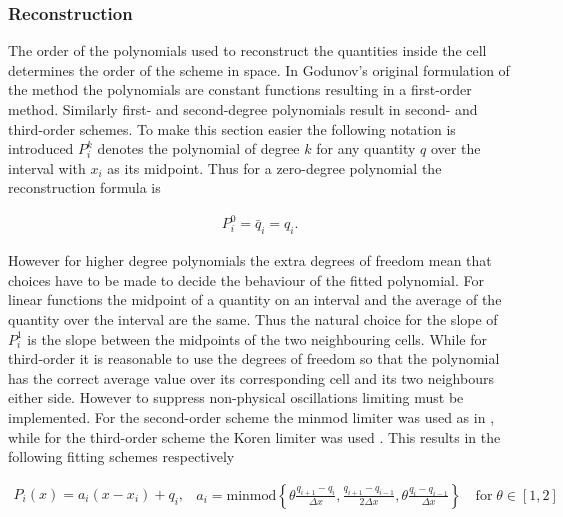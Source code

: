 \documentclass[SingleSpace,12pt]{Serre_ASCE}
\begin{document}
\subsubsection{Reconstruction} %
The order of the polynomials used to reconstruct the quantities inside the cell determines the order of the scheme in space. In Godunov's original formulation of the method \cite{Godunov-1959-271} the polynomials are constant functions resulting in a first-order method. Similarly first- and second-degree polynomials result in second- and third-order schemes. To make this section easier the following notation is introduced $P^k_i$ denotes the polynomial of degree $k$ for any quantity $q$ over the interval with $x_i$ as its midpoint. Thus for a zero-degree polynomial the reconstruction formula is
\begin{linenomath*}
\begin{gather} \label{eq:recon0}
P^0_i = \bar{q}_i = q_i.
\end{gather}
\end{linenomath*}
However for higher degree polynomials the extra degrees of freedom mean that choices have to be made to decide the behaviour of the fitted polynomial. For linear functions the midpoint of a quantity on an interval and the average of the quantity over the interval are the same. Thus the natural choice for the slope of $P^1_i$ is the slope between the midpoints of the two neighbouring cells. While for third-order it is reasonable to use the degrees of freedom so that the polynomial has the correct average value over its corresponding cell and its two neighbours either side. However to suppress non-physical oscillations limiting must be implemented. For the second-order scheme the minmod limiter was used as in \cite{Kurganov-etal-2001-707}, while for the third-order scheme the Koren limiter was used \cite{Koren-1993}. This results in the following fitting schemes respectively
\begin{linenomath*}
\begin{subequations}\label{eq:recon1}
\begin{gather}\label{eq:recon11}
P_i(x) = a_i\left(x - x_i\right) + q_i,
\end{gather}
\begin{gather}\label{eq:recon12}
a_i = \text{minmod}\left\lbrace\theta \frac{q_{i+1} - q_{i}}{\Delta x}, \frac{q_{i+1} - q_{i-1}}{2\Delta x} ,\theta \frac{q_{i} - q_{i-1}}{\Delta x}\right\rbrace \quad \text{for} \; \theta \in \left[1,2\right]
\end{gather}
\end{subequations}
\end{linenomath*}
\end{document}
